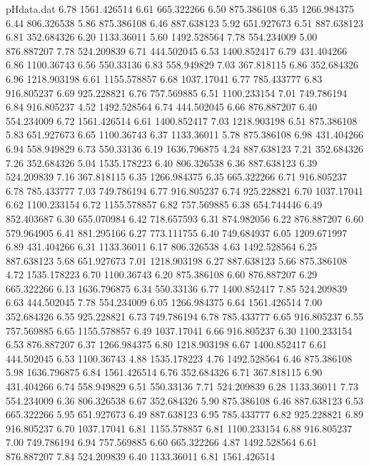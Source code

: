 \begin{filecontents}{pHdata.dat}
6.78 	1561.426514
6.61 	665.322266
6.50 	875.386108
6.35 	1266.984375
6.44 	806.326538
5.86 	875.386108
6.46 	887.638123
5.92 	651.927673
6.51 	887.638123
6.81 	352.684326
6.20 	1133.36011
5.60 	1492.528564
7.78 	554.234009
5.00 	876.887207
7.78 	524.209839
6.71 	444.502045
6.53 	1400.852417
6.79 	431.404266
6.86 	1100.36743
6.56 	550.33136
6.83 	558.949829
7.03 	367.818115
6.86 	352.684326
6.96 	1218.903198
6.61 	1155.578857
6.68 	1037.17041
6.77 	785.433777
6.83 	916.805237
6.69 	925.228821
6.76 	757.569885
6.51 	1100.233154
7.01 	749.786194
6.84 	916.805237
4.52 	1492.528564
6.74 	444.502045
6.66 	876.887207
6.40 	554.234009
6.72 	1561.426514
6.61 	1400.852417
7.03 	1218.903198
6.51 	875.386108
5.83 	651.927673
6.65 	1100.36743
6.37 	1133.36011
5.78 	875.386108
6.98 	431.404266
6.94 	558.949829
6.73 	550.33136
6.19 	1636.796875
4.24 	887.638123
7.21 	352.684326
7.26 	352.684326
5.04 	1535.178223
6.40 	806.326538
6.36 	887.638123
6.39 	524.209839
7.16 	367.818115
6.35 	1266.984375
6.35 	665.322266
6.71 	916.805237
6.78 	785.433777
7.03 	749.786194
6.77 	916.805237
6.74 	925.228821
6.70 	1037.17041
6.62 	1100.233154
6.72 	1155.578857
6.82 	757.569885
6.38 	654.744446
6.49 	852.403687
6.30 	655.070984
6.42 	718.657593
6.31 	874.982056
6.22 	876.887207
6.60 	579.964905
6.41 	881.295166
6.27 	773.111755
6.40 	749.684937
6.05 	1209.671997
6.89 	431.404266
6.31 	1133.36011
6.17 	806.326538
4.63 	1492.528564
6.25 	887.638123
5.68 	651.927673
7.01 	1218.903198
6.27 	887.638123
5.66 	875.386108
4.72 	1535.178223
6.70 	1100.36743
6.20 	875.386108
6.60 	876.887207
6.29 	665.322266
6.13 	1636.796875
6.34 	550.33136
6.77 	1400.852417
7.85 	524.209839
6.63 	444.502045
7.78 	554.234009
6.05 	1266.984375
6.64 	1561.426514
7.00 	352.684326
6.55 	925.228821
6.73 	749.786194
6.78 	785.433777
6.65 	916.805237
6.55 	757.569885
6.65 	1155.578857
6.49 	1037.17041
6.66 	916.805237
6.30 	1100.233154
6.53 	876.887207
6.37 	1266.984375
6.80 	1218.903198
6.67 	1400.852417
6.61 	444.502045
6.53 	1100.36743
4.88 	1535.178223
4.76 	1492.528564
6.46 	875.386108
5.98 	1636.796875
6.84 	1561.426514
6.76 	352.684326
6.71 	367.818115
6.90 	431.404266
6.74 	558.949829
6.51 	550.33136
7.71 	524.209839
6.28 	1133.36011
7.73 	554.234009
6.36 	806.326538
6.67 	352.684326
5.90 	875.386108
6.46 	887.638123
6.53 	665.322266
5.95 	651.927673
6.49 	887.638123
6.95 	785.433777
6.82 	925.228821
6.89 	916.805237
6.70 	1037.17041
6.81 	1155.578857
6.81 	1100.233154
6.88 	916.805237
7.00 	749.786194
6.94 	757.569885
6.60	665.322266
4.87	1492.528564
6.61	876.887207
7.84	524.209839
6.40	1133.36011
6.81	1561.426514

\end{filecontents}
